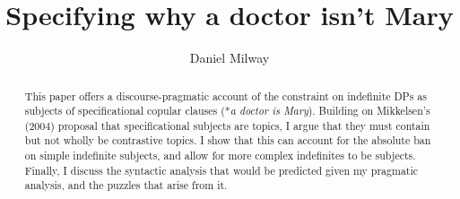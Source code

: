 \documentclass[
	letterpaper,
]{article}
\title{Specifying why a doctor isn't Mary}
\author{Daniel Milway%
}
\date{}
\begin{document}
\maketitle
\begin{abstract}
  This paper offers a discourse-pragmatic account of the constraint on indefinite DPs as subjects of specificational copular clauses (*\textit{a doctor is Mary}).
  Building on Mikkelsen's (2004) proposal that specificational subjects are topics, I argue that they must contain but not wholly be contrastive topics.
  I show that this can account for the absolute ban on simple indefinite subjects, and allow for more complex indefinites to be subjects.
  Finally, I discuss the syntactic analysis that would be predicted given my pragmatic analysis, and the puzzles that arise from it.
\end{abstract}
\doublespacing
\end{document}
